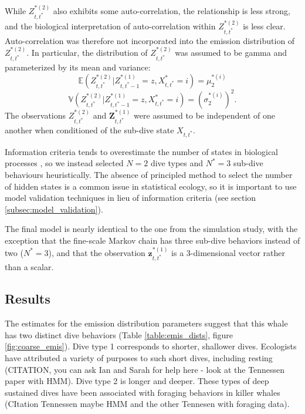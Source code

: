 While $Z^{*(2)}_{t,t^*}$ also exhibits some auto-correlation, the relationship is less strong, and the biological interpretation of auto-correlation within $Z^{*(2)}_{t,t^*}$ is less clear. Auto-correlation was therefore not incorporated into the emission distribution of $Z^{*(2)}_{t,t^*}$. In particular, the distribution of $Z^{*(2)}_{t,t^*}$ was assumed to be gamma and parameterized by its mean and variance:
%
$$\mathbb{E}(Z^{*(2)}_{t,t^*}|Z^{*(1)}_{t,t^*-1} = z,X^*_{t,t^*} = i) = \mu_2^{*(i)}$$
$$\mathbb{V}(Z^{*(2)}_{t,t^*}|Z^{*(1)}_{t,t^*-1} = z,X^*_{t,t^*} = i) = \left(\sigma_2^{*(i)}\right)^2.$$
%
The observations $Z^{*(2)}_{t,t^*}$ and $\mathbf{Z}^{*(1)}_{t,t^*}$ were assumed to be independent of one another when conditioned of the sub-dive state $X_{t,t^*}$.

Information criteria tends to overestimate the number of states in biological processes \citep{Pohle:2017}, so we instead selected $N = 2$ dive types and $N^* = 3$ sub-dive behaviours heuristically. The absence of principled method to select the number of hidden states is a common issue in statistical ecology, so it is important to use model validation techniques in lieu of information criteria (see section \ref{subsec:model_validation}).

The final model is nearly identical to the one from the simulation study, with the exception that the fine-scale Markov chain has three sub-dive behaviors instead of two ($N^* = 3$), and that the observation $\mathbf{z}^{*(1)}_{t,t^*}$ is a 3-dimensional vector rather than a scalar.

\subsection{Results}

The estimates for the emission distribution parameters suggest that this whale has two distinct dive behaviors (Table \ref{table:emis_dists},  figure \ref{fig:coarse_emis}). Dive type 1 corresponds to shorter, shallower dives. Ecologists have attributed a variety of purposes to such short dives, including resting (CITATION, you can ask Ian and Sarah for help here - look at the Tennessen paper with HMM). Dive type 2 is longer and deeper. These types of deep sustained dives have been associated with foraging behaviors in killer whales (CItation Tennessen maybe HMM and the other Tennesen with foraging data).

